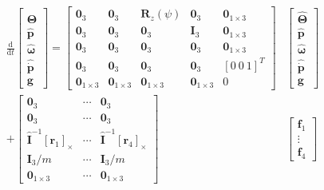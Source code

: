 \documentclass{article}
\begin{document}
$$
\begin{aligned}
    \frac{\mathrm{d}}{\mathrm{d} t}\left[
    \begin{array}{c}
        \hat{\mathbf\Theta} \\
        \hat{\mathbf{p}} \\
        \hat{\mathbf{\omega}} \\
        \hat{\dot{\mathbf{p}}}\\
        \mathbf g
    \end{array}
    \right]=
    \left[
    \begin{array}{lllll}
        \mathbf{0}_{3} & \mathbf{0}_{3} & \mathbf{R}_{z}(\psi) & \mathbf{0}_{3} & \mathbf 0_{1\times 3}\\
        \mathbf{0}_{3} & \mathbf{0}_{3} & \mathbf{0}_{3} & \mathbf{I}_{3} & \mathbf 0_{1\times 3}\\
        \mathbf{0}_{3} & \mathbf{0}_{3} & \mathbf{0}_{3} & \mathbf{0}_{3} & \mathbf 0_{1\times 3}\\
        \mathbf{0}_{3} & \mathbf{0}_{3} & \mathbf{0}_{3} & \mathbf{0}_{3} & [0\ 0\ 1]^T\\
        \mathbf{0}_{1\times 3} & \mathbf{0}_{1\times 3} & \mathbf{0}_{1\times 3} & \mathbf{0}_{1\times 3} & 0
    \end{array}
    \right]&\left[
    \begin{array}{c}
        \hat{\mathbf{\Theta}} \\
        \hat{\mathbf{p}} \\
        \hat{\mathbf \omega} \\
        \hat{\dot{\mathbf{p}}}\\
        \mathbf g
    \end{array}\right]\\
    +\left[
    \begin{array}{lll}
        \mathbf{0}_{3} & \cdots & \mathbf{0}_{3} \\
        \mathbf{0}_{3} & \cdots & \mathbf{0}_{3} \\
        \hat{\mathbf{I}}^{-1}\left[\mathbf{r}_{1}\right]_{\times} & \cdots & \hat{\mathbf{I}}^{-1}\left[\mathbf{r}_{4}\right]_\times \\
        \mathbf{I}_{3} / m & \cdots & \mathbf{I}_{3} / m\\
        \mathbf{0}_{1\times 3}&\cdots&\mathbf{0}_{1\times 3}
    \end{array}
    \right]
    &\left[\begin{array}{c}
    \mathbf{f}_{1} \\
    \vdots \\
    \mathbf{f}_{4}
    \end{array}\right]
\end{aligned}
$$
\end{document}
